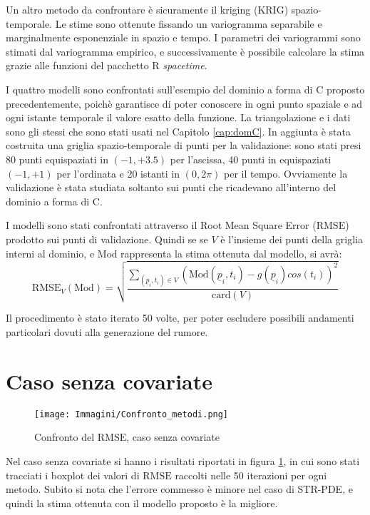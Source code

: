 \documentclass[a4paper,11pt,twoside,openright]{book}							%
\begin{document}
Un altro metodo da confrontare è sicuramente il kriging (KRIG) spazio-temporale. Le stime sono ottenute fissando un variogramma separabile e marginalmente esponenziale in spazio e tempo. I parametri dei variogrammi sono stimati dal variogramma empirico, e successivamente è possibile calcolare la stima grazie alle funzioni del pacchetto R \textit{spacetime}.

I quattro modelli sono confrontati sull'esempio del dominio a forma di C proposto precedentemente, poichè garantisce di poter conoscere in ogni punto spaziale e ad ogni istante temporale il valore esatto della funzione. La triangolazione e i dati sono gli stessi che sono stati usati nel Capitolo \ref{cap:domC}. In aggiunta è stata costruita una griglia spazio-temporale di punti per la validazione: sono stati presi 80 punti equispaziati in $(-1,+3.5)$ per l'ascissa, 40 punti in equispaziati $(-1,+1)$ per l'ordinata e 20 istanti in $(0,2\pi)$ per il tempo. Ovviamente la validazione è stata studiata soltanto sui punti che ricadevano all'interno del dominio a forma di C.

I modelli sono stati confrontati attraverso il Root Mean Square Error ($\mathrm{RMSE}$) prodotto sui punti di validazione. Quindi se se $V$ è l'insieme dei punti della griglia interni al dominio, e $\mathrm{Mod}$ rappresenta la stima ottenuta dal modello, si avrà:
$$
\mathrm{RMSE}_V(\mathrm{Mod})=\sqrt{\frac{\sum_{(\underline p_i,t_i)\in V} (\mathrm{Mod}(\underline p_i,t_i)-g(\underline p_i)cos(t_i))^2}{\mathrm{card}(V)}}
$$ 

Il procedimento è stato iterato 50 volte, per poter escludere possibili andamenti particolari dovuti alla generazione del rumore.
 
\section{Caso senza covariate}

\begin{figure}[t]
	\centering
	\texttt{[image: Immagini/Confronto\_metodi.png]}   
	\caption{Confronto del $\mathrm{RMSE}$, caso senza covariate}
	\label{fig:cfr}
\end{figure}

Nel caso senza covariate si hanno i risultati riportati in figura \ref{fig:cfr}, in cui sono stati tracciati i boxplot dei valori di $\mathrm{RMSE}$ raccolti nelle 50 iterazioni per ogni metodo. Subito si nota che l'errore commesso è minore nel caso di STR-PDE, e quindi la stima ottenuta con il modello proposto è la migliore.
\end{document}

